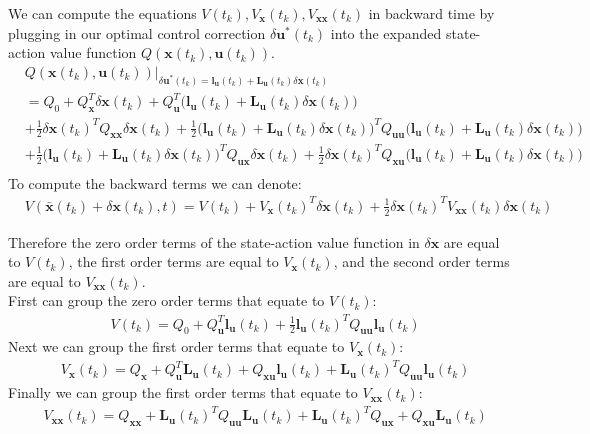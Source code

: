 \documentclass[11pt]{homework}
\renewcommand{\vec}[1]{\ensuremath{\boldsymbol{#1}}}
\begin{document}
\begin{arabicparts}
		\questionpart
	We can compute the equations $V(t_k), V_{\vec{x}}(t_k), V_{\vec{xx}}(t_k)$ in backward time by plugging in our optimal control correction $\delta\vec{u}^{*}(t_{k})$ into the expanded state-action value function $Q(\vec{x}(t_{k}), \vec{u}(t_{k}))$. 
			\begin{align*}
				& Q(\vec{x}(t_{k}), \vec{u}(t_{k}))\Big|_{\delta\vec{u}^{*}(t_{k}) = \vec{l}_{\vec{u}}(t_{k}) + \vec{L}_{\vec{u}}(t_{k})\delta\vec{x}(t_{k})} \\
				& =  Q_{0} + Q_{\vec{x}}^{T}\delta\vec{x}(t_{k}) + Q_{\vec{u}}^{T}\Big(\vec{l}_{\vec{u}}(t_{k}) + \vec{L}_{\vec{u}}(t_{k})\delta\vec{x}(t_{k})\Big) \\
				& + \frac{1}{2}\delta\vec{x}(t_{k})^{T}Q_{\vec{xx}}\delta\vec{x}(t_{k}) + \frac{1}{2}\Big(\vec{l}_{\vec{u}}(t_{k}) + \vec{L}_{\vec{u}}(t_{k})\delta\vec{x}(t_{k})\Big)^{T}Q_{\vec{uu}}\Big(\vec{l}_{\vec{u}}(t_{k}) + \vec{L}_{\vec{u}}(t_{k})\delta\vec{x}(t_{k})\Big) \\
				& + \frac{1}{2}\Big(\vec{l}_{\vec{u}}(t_{k}) + \vec{L}_{\vec{u}}(t_{k})\delta\vec{x}(t_{k})\Big)^{T}Q_{\vec{ux}}\delta\vec{x}(t_{k}) + \frac{1}{2}\delta\vec{x}(t_{k})^{T}Q_{\vec{xu}}\Big(\vec{l}_{\vec{u}}(t_{k}) + \vec{L}_{\vec{u}}(t_{k})\delta\vec{x}(t_{k})\Big) \\
			\end{align*}
		To compute the backward terms we can denote:
			\begin{align*}
				& V(\bar{\vec{x}}(t_{k}) + \delta\vec{x}(t_{k}),t) = V(t_k) + V_{\vec{x}}(t_{k})^T\delta\vec{x}(t_{k}) + \frac{1}{2}\delta\vec{x}(t_{k})^TV_{\vec{xx}}(t_{k})\delta\vec{x}(t_{k}) 
			\end{align*}

		Therefore the zero order terms of the state-action value function in $\delta\vec{x}$ are equal to $V(t_k)$, the first order terms are equal to $V_{\vec{x}}(t_{k})$, and the second order terms are equal to $V_{\vec{xx}}(t_{k})$. \\
	
		First can group the zero order terms that equate to $V(t_k)$: 
			\begin{align*}
				& V(t_k) = Q_{0} + Q_{\vec{u}}^{T}\vec{l}_{\vec{u}}(t_{k}) + \frac{1}{2}\vec{l}_{\vec{u}}(t_{k})^{T}Q_{\vec{uu}}\vec{l}_{\vec{u}}(t_{k})
			\end{align*}
		Next we can group the first order terms that equate to $V_{\vec{x}}(t_{k})$:
			\begin{align*}
				& V_{\vec{x}}(t_{k}) = Q_{\vec{x}} + Q_{\vec{u}}^{T}\vec{L}_{\vec{u}}(t_{k}) + Q_{\vec{xu}}\vec{l}_{\vec{u}}(t_{k}) + \vec{L}_{\vec{u}}(t_{k})^{T}Q_{\vec{uu}}\vec{l}_{\vec{u}}(t_{k}) 
			\end{align*}
		Finally we can group the first order terms that equate to $V_{\vec{xx}}(t_{k})$:
			\begin{align*}
				& V_{\vec{xx}}(t_{k}) = Q_{\vec{xx}} + \vec{L}_{\vec{u}}(t_{k})^{T}Q_{\vec{uu}}\vec{L}_{\vec{u}}(t_{k}) + \vec{L}_{\vec{u}}(t_{k})^{T}Q_{\vec{ux}} + Q_{\vec{xu}}\vec{L}_{\vec{u}}(t_{k}) 
			\end{align*}
	

\end{arabicparts}
\end{document}
